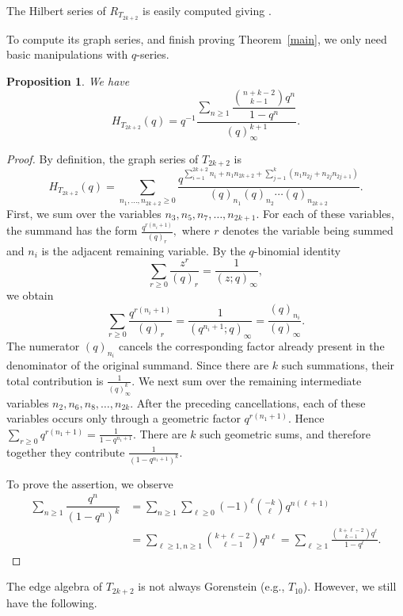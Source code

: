 \documentclass[pdftex]{sigma}
\numberwithin{equation}{section}
\newtheorem{Proposition}[Theorem]{Proposition}
\theoremstyle{definition}
\begin{document}
The Hilbert series of $R_{T_{2k+2}}$ is easily computed giving .


To compute its graph series, and finish proving Theorem~\ref{main}, we only need basic manipulations with $q$-series.
\begin{Proposition} We have
\[
H_{T_{2k+2}}(q)=q^{-1}\frac{\sum_{n \geq 1} \dfrac{{n+k-2 \choose k-1}q^n}{1-q^n}}{(q)_\infty^{k+1}}.
\]
\end{Proposition}
\begin{proof} By definition, the graph series of $T_{2k+2}$ is
\[
H_{T_{2k+2}}(q)
=
\sum_{n_1,\dots,n_{2k+2}\geq0}
\frac{
q^{
\sum_{i=1}^{2k+2}n_i
+n_1n_{2k+2}
+\sum_{j=1}^{k} (n_1n_{2j}+n_{2j}n_{2j+1} )
}
}{
(q)_{n_1}(q)_{n_2}\cdots(q)_{n_{2k+2}}
}.
\]
First, we sum over the variables $n_3,n_5,n_7,\dots,n_{2k+1}. $ For each of these variables, the summand has the form $ \frac{q^{r(n_i+1)}}{(q)_r},$ where $r$ denotes the variable being summed and $n_i$ is the adjacent remaining variable. By the $q$-binomial identity \[ \sum_{r\geq0}\frac{z^r}{(q)_r} = \frac{1}{(z;q)_\infty}, \] we obtain \[ \sum_{r\geq0}\frac{q^{r(n_i+1)}}{(q)_r} = \frac{1}{(q^{n_i+1};q)_\infty} = \frac{(q)_{n_i}}{(q)_\infty}. \] The numerator $(q)_{n_i}$ cancels the corresponding factor already present in the denominator of the original summand. Since there are $k$ such summations, their total contribution is $\frac{1}{(q)_\infty^k}. $ We next sum over the remaining intermediate variables $ n_2,n_6,n_8,\dots,n_{2k}.$ After the preceding cancellations, each of these variables occurs only through a geometric factor $q^{r(n_1+1)}$. Hence $ \sum_{r\geq0}q^{r(n_1+1)} = \frac{1}{1-q^{n_1+1}}. $ There are $k$ such geometric sums, and therefore together they contribute $ \frac{1}{(1-q^{n_1+1})^k}. $

To prove the assertion, we observe
\begin{align*}
\sum_{n \geq 1} \dfrac{q^n}{(1-q^n)^k}& =\sum_{n \geq 1} \sum_{\ell \geq 0}(-1)^\ell {-k \choose \ell } q^{n (\ell+1)}\\
& = \sum_{\ell \geq 1, n \geq 1} {k+\ell-2 \choose \ell-1} q^{n \ell}=\sum_{\ell \geq 1} \frac{{k+\ell-2 \choose k-1} q^\ell}{1-q^\ell}.\tag*{\qed}
\end{align*}\renewcommand{\qed}{}
\end{proof}

The edge algebra of $T_{2k+2}$ is not always Gorenstein (e.g., $T_{10}$). However, we still have the following.
\end{document}
